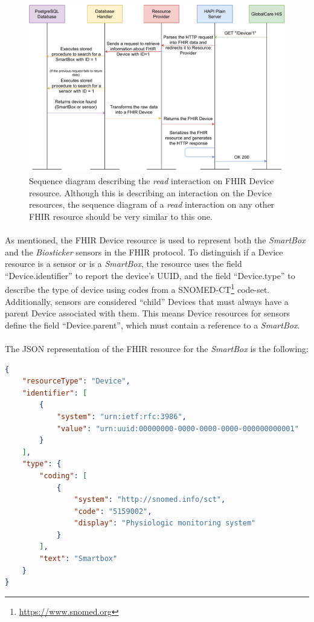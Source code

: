 \begin{figure}[H]
    \centering
    \includegraphics[width=0.9\linewidth]{images/fhir get device.pdf}
    \caption[Sequence diagram describing the \textit{read} interaction on \acs{FHIR} Device resource.]{Sequence diagram describing the \textit{read} interaction on \acs{FHIR} Device resource. Although this is describing an interaction on the Device resources, the sequence diagram of a \textit{read} interaction on any other \acs{FHIR} resource should be very similar to this one.}
    \label{fig:fhir-get-device}
\end{figure} 

\paragraph{} As mentioned, the \acs{FHIR} Device resource is used to represent both the \textit{SmartBox} and the \textit{Biosticker} sensors in the \acs{FHIR} protocol. To distinguish if a Device resource is a sensor or is a \textit{SmartBox}, the resource uses the field ``Device.identifier'' to report the device's \acs{UUID}, and the field ``Device.type'' to describe the type of device using codes from a SNOMED-CT\footnote{\url {https://www.snomed.org}} code-set. Additionally, sensors are considered ``child'' Devices that must always have a parent Device associated with them. This means Device resources for sensors define the field ``Device.parent'', which must contain a reference to a \textit{SmartBox}. 

\paragraph{} The \acs{JSON} representation of the \acs{FHIR} resource for the \textit{SmartBox} is the following:
\begin{lstlisting}[language=json]            
{ 
    "resourceType": "Device", 
    "identifier": [ 
        { 
            "system": "urn:ietf:rfc:3986", 
            "value": "urn:uuid:00000000-0000-0000-0000-000000000001"  
        } 
    ], 
    "type": { 
        "coding": [ 
            { 
                "system": "http://snomed.info/sct", 
                "code": "5159002", 
                "display": "Physiologic monitoring system" 
            } 
        ], 
        "text": "Smartbox" 
    } 
}
\end{lstlisting} 
